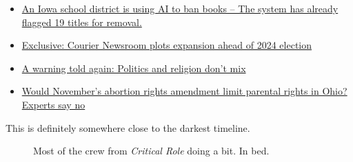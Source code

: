 \begin{itemize}
\item
  \href{https://www.engadget.com/mason-city-iowa-school-district-ai-book-ban-censorship-202541565.html?src=rss&guccounter=1}{An
  Iowa school district is using AI to ban books -- The system has
  already flagged 19 titles for removal.}
\item
  \href{https://www.axios.com/2023/08/15/courier-newsroom-expansion-ahead-2024-election?utm_source=newsletter&utm_medium=email&utm_campaign=newsletter_axiosmediatrends&stream=top}{Exclusive:
  Courier Newsroom plots expansion ahead of 2024 election}
\item
  \href{https://ohiocapitaljournal.com/2023/08/16/a-warning-told-again-politics-and-religion-dont-mix/}{A
  warning told again: Politics and religion don't mix}
\item
  \href{https://ohiocapitaljournal.com/2023/08/16/would-novembers-abortion-rights-amendment-limit-parental-rights-in-ohio-evidence-is-lacking/}{Would
  November's abortion rights amendment limit parental rights in Ohio?
  Experts say no}
\end{itemize}

This is definitely somewhere close to the darkest timeline.

\begin{figure}
\centering
{}
\caption{Most of the crew from \emph{Critical Role} doing a bit. In
bed.}
\end{figure}
